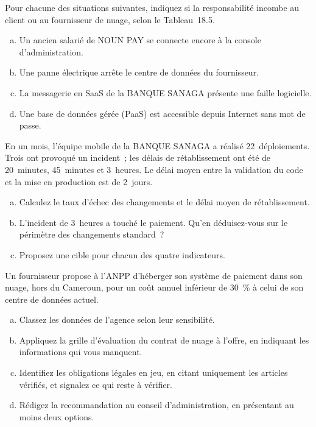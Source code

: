 \bigskip

\begin{boxexo}[title={\ding{45}\quad Exercice~18.1. Qui est responsable~? \niveaubase}]
Pour chacune des situations suivantes, indiquez si la responsabilité
incombe au client ou au fournisseur de nuage, selon le Tableau~18.5.
\begin{enumerate}[(a)]
    \item Un ancien salarié de NOUN PAY se connecte encore à la console
          d'administration.
    \item Une panne électrique arrête le centre de données du fournisseur.
    \item La messagerie en SaaS de la BANQUE SANAGA présente une faille
          logicielle.
    \item Une base de données gérée (PaaS) est accessible depuis Internet
          sans mot de passe.
\end{enumerate}
\end{boxexo}

\begin{boxexo}[title={\ding{45}\quad Exercice~18.2. Calculer les indicateurs de livraison \niveaumoyen}]
En un mois, l'équipe mobile de la BANQUE SANAGA a réalisé 22~déploiements.
Trois ont provoqué un incident~; les délais de rétablissement ont été de
20~minutes, 45~minutes et 3~heures. Le délai moyen entre la validation du
code et la mise en production est de 2~jours.
\begin{enumerate}[(a)]
    \item Calculez le taux d'échec des changements et le délai moyen de
          rétablissement.
    \item L'incident de 3~heures a touché le paiement. Qu'en déduisez-vous
          sur le périmètre des changements standard~?
    \item Proposez une cible pour chacun des quatre indicateurs.
\end{enumerate}
\end{boxexo}

\begin{boxexo}[title={\ding{45}\quad Exercice~18.3. Migrer l'ANPP vers le nuage~? \niveauexpert}]
Un fournisseur propose à l'ANPP d'héberger son système de paiement dans
son nuage, hors du Cameroun, pour un coût annuel inférieur de 30~\% à celui
de son centre de données actuel.
\begin{enumerate}[(a)]
    \item Classez les données de l'agence selon leur sensibilité.
    \item Appliquez la grille d'évaluation du contrat de nuage à l'offre,
          en indiquant les informations qui vous manquent.
    \item Identifiez les obligations légales en jeu, en citant uniquement
          les articles vérifiés, et signalez ce qui reste à vérifier.
    \item Rédigez la recommandation au conseil d'administration, en
          présentant au moins deux options.
\end{enumerate}
\end{boxexo}

